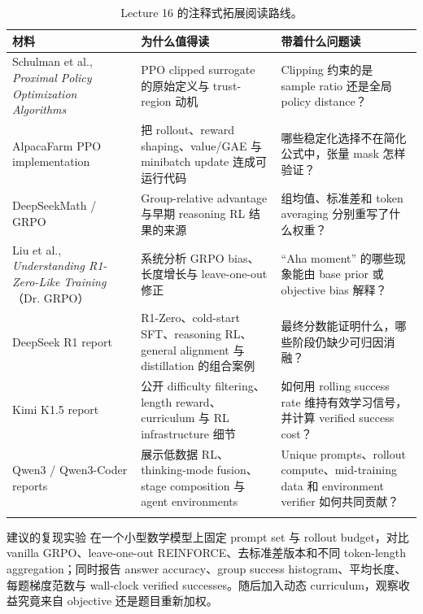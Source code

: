 \begin{longtable}{L{0.22\textwidth}L{0.31\textwidth}L{0.37\textwidth}}
\toprule
材料 & 为什么值得读 & 带着什么问题读 \\
\midrule
Schulman et al., \emph{Proximal Policy Optimization Algorithms} & PPO clipped surrogate 的原始定义与 trust-region 动机 & Clipping 约束的是 sample ratio 还是全局 policy distance？ \\
AlpacaFarm PPO implementation & 把 rollout、reward shaping、value/GAE 与 minibatch update 连成可运行代码 & 哪些稳定化选择不在简化公式中，张量 mask 怎样验证？ \\
DeepSeekMath / GRPO & Group-relative advantage 与早期 reasoning RL 结果的来源 & 组均值、标准差和 token averaging 分别重写了什么权重？ \\
Liu et al., \emph{Understanding R1-Zero-Like Training}（Dr. GRPO） & 系统分析 GRPO bias、长度增长与 leave-one-out 修正 & ``Aha moment'' 的哪些现象能由 base prior 或 objective bias 解释？ \\
DeepSeek R1 report & R1-Zero、cold-start SFT、reasoning RL、general alignment 与 distillation 的组合案例 & 最终分数能证明什么，哪些阶段仍缺少可归因消融？ \\
Kimi K1.5 report & 公开 difficulty filtering、length reward、curriculum 与 RL infrastructure 细节 & 如何用 rolling success rate 维持有效学习信号，并计算 verified success cost？ \\
Qwen3 / Qwen3-Coder reports & 展示低数据 RL、thinking-mode fusion、stage composition 与 agent environments & Unique prompts、rollout compute、mid-training data 和 environment verifier 如何共同贡献？ \\
\bottomrule
\caption{Lecture 16 的注释式拓展阅读路线。}
\end{longtable}

\begin{knowledgebox}{建议的复现实验}
在一个小型数学模型上固定 prompt set 与 rollout budget，对比 vanilla GRPO、leave-one-out REINFORCE、去标准差版本和不同 token-length aggregation；同时报告 answer accuracy、group success histogram、平均长度、每题梯度范数与 wall-clock verified successes。随后加入动态 curriculum，观察收益究竟来自 objective 还是题目重新加权。
\end{knowledgebox}


